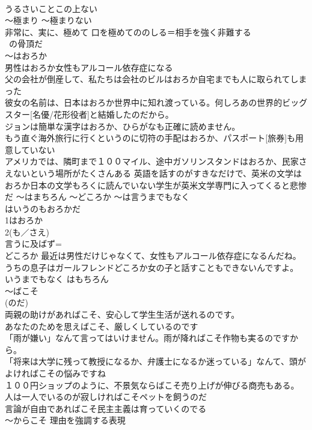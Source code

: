 \documentclass[8pt]{extreport}
\begin{document}
\begin{CJK}{UTF8}{min}
\\	うるさいことこの上ない 
\\	～極まり ～極まりない
\\	非常に、実に、極めて 口を極めてののしる＝相手を強く非難する 
\\	~の骨頂だ
\\	～はおろか 
\\	男性はおろか女性もアルコール依存症になる
\\	父の会社が倒産して、私たちは会社のビルはおろか自宅までも人に取られてしまった 
\\	彼女の名前は、日本はおろか世界中に知れ渡っている。何しろあの世界的ビッグスター[名優/花形役者]と結婚したのだから。
\\	ジョンは簡単な漢字はおろか、ひらがなも正確に読めません。 
\\	もう直ぐ海外旅行に行くというのに切符の手配はおろか、パスポート[旅券]も用意していない 
\\	アメリカでは、隣町まで１００マイル、途中ガソリンスタンドはおろか、民家さえないという場所がたくさんある 英語を話すのがすきなだけで、英米の文学はおろか日本の文学もろくに読んでいない学生が英米文学専門に入ってくると悲惨だ	～はまちろん ～どころか ～は言うまでもなく
\\	はいうのもおろかだ 
\\	1はおろか
\\	2(も／さえ) 
\\	言うに及ばず=
\\	どころか 最近は男性だけじゃなくて、女性もアルコール依存症になるんだね。
\\	うちの息子はガールフレンドどころか女の子と話すこともできないんですよ。 いうまでもなく はもちろん
\\	～ばこそ 
\\	(のだ)	
\\	両親の助けがあればこそ、安心して学生生活が送れるのです。 
\\	あなたのためを思えばこそ、厳しくしているのです 
\\	「雨が嫌い」なんて言ってはいけません。雨が降ればこそ作物も実るのですから。 
\\	「将来は大学に残って教授になるか、弁護士になるか迷っている」なんて、頭がよければこその悩みですね 
\\	１００円ショップのように、不景気ならばこそ売り上げが伸びる商売もある。 
\\	人は一人でいるのが寂しければこそペットを飼うのだ 
\\	言論が自由であればこそ民主主義は育っていくのでる 
\\	～からこそ 理由を強調する表現 

\end{CJK}
\end{document}
